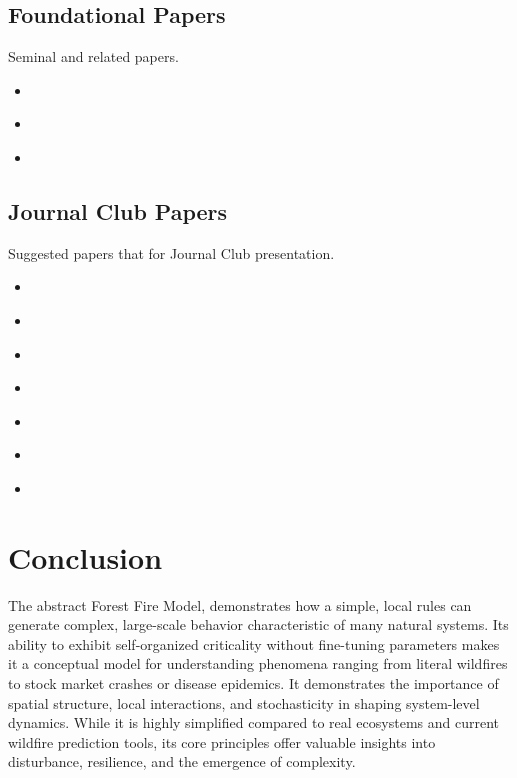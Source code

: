 \documentclass{article}
\begin{document}
\subsection{Foundational Papers}
Seminal and related papers.
\begin{itemize}
    \item \textcite{ForestFire_Bak1990}
    \item \textcite{ForestFire_Chen1990}
    \item \textcite{ForestFire_Drossel1992}
\end{itemize}

\subsection{Journal Club Papers}
Suggested papers that for Journal Club presentation.
\begin{itemize}
    \item \textcite{ForestFire_Rui2017}
    \item \textcite{ForestFire_Zhou2025}
    \item \textcite{ForestFire_Zheng2017}
    \item \textcite{ForestFire_Mutthulakshmi2020}
    \item \textcite{ForestFire_Freire2019}
    \item \textcite{ForestFire_Alexandridis2008}
    \item \textcite{ForestFire_Mutthulakshmi2020}
    
\end{itemize}

\section{Conclusion}
The abstract Forest Fire Model, demonstrates  how a simple, local rules can generate complex, large-scale behavior characteristic of many natural systems. Its ability to exhibit self-organized criticality without fine-tuning parameters makes it a conceptual model for understanding phenomena ranging from literal wildfires to stock market crashes or disease epidemics. It demonstrates the importance of spatial structure, local interactions, and stochasticity in shaping system-level dynamics. While it is highly simplified compared to real ecosystems and current wildfire prediction tools, its core principles offer valuable insights into disturbance, resilience, and the emergence of complexity. 

\printbibliography %
\end{document}

